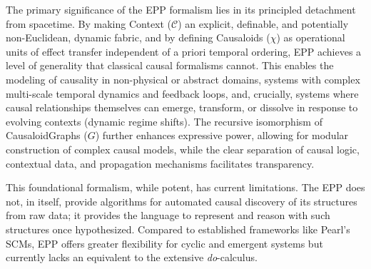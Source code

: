 The primary significance of the EPP formalism lies in its principled detachment from spacetime. By making Context (\(\mathcal{C}\)) an explicit, definable, and potentially non-Euclidean, dynamic fabric, and by defining Causaloids (\(\chi\)) as operational units of effect transfer independent of a priori temporal ordering, EPP achieves a level of generality that classical causal formalisms cannot. This enables the modeling of causality in non-physical or abstract domains, systems with complex multi-scale temporal dynamics and feedback loops, and, crucially, systems where causal relationships themselves can emerge, transform, or dissolve in response to evolving contexts (dynamic regime shifts). The recursive isomorphism of CausaloidGraphs (\(G\)) further enhances expressive power, allowing for modular construction of complex causal models, while the clear separation of causal logic, contextual data, and propagation mechanisms facilitates transparency.

This foundational formalism, while potent, has current limitations. The EPP does not, in itself, provide algorithms for automated causal discovery of its structures from raw data; it provides the language to represent and reason with such structures once hypothesized. Compared to established frameworks like Pearl's SCMs, EPP offers greater flexibility for cyclic and emergent systems but currently lacks an equivalent to the extensive \textit{do}-calculus.

\newpage    